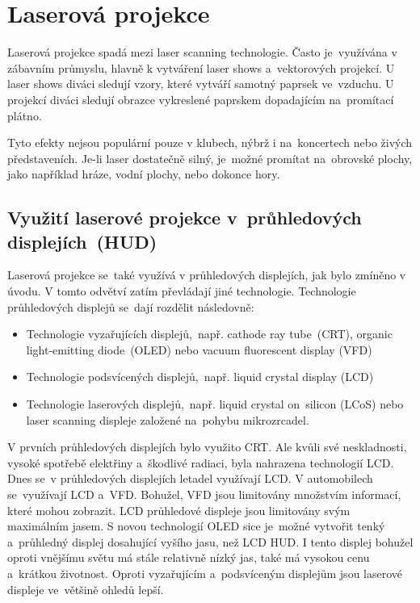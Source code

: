 \chapter{Laserová projekce~\cite{laser-projection}}
Laserová projekce spadá mezi laser scanning technologie. Často je~využívána v zábavním průmyslu, hlavně k vytváření laser shows a~vektorových projekcí. U laser shows diváci sledují vzory, které vytváří samotný paprsek ve~vzduchu. U projekcí diváci sledují obrazce vykreslené paprskem dopadajícím na~promítací plátno.

Tyto efekty nejsou populární pouze v klubech, nýbrž i na~koncertech nebo živých představeních. Je-li laser dostatečně silný, je~možné promítat na~obrovské plochy, jako například hráze, vodní plochy, nebo dokonce hory.

\section{Využití laserové projekce v~průhledových displejích~(HUD)~\cite{laser-huds}\cite{dev-of-laser-huds-in-driving}}
Laserová projekce se~také využívá v průhledových displejích, jak bylo zmíněno v úvodu. V tomto odvětví zatím převládají jiné technologie. Technologie průhledových displejů se~dají rozdělit následovně:

\begin{itemize}
  \item Technologie vyzařujících displejů,~např. cathode ray tube~(CRT), organic light-emitting diode~(OLED) nebo vacuum fluorescent display (VFD)
  \item Technologie podsvícených displejů,~např. liquid crystal display (LCD)
  \item Technologie laserových displejů,~např. liquid crystal on~silicon (LCoS) nebo laser scanning displeje založené na~pohybu mikrozrcadel.
\end{itemize}

V prvních průhledových displejích bylo využito CRT. Ale kvůli své neskladnosti, vysoké spotřebě elektřiny a~škodlivé radiaci, byla nahrazena technologií LCD. Dnes se~v průhledových displejích letadel využívají LCD. V automobilech se~využívají LCD a~VFD.
Bohužel, VFD jsou limitovány množstvím informací, které mohou zobrazit. LCD průhledové displeje jsou limitovány svým maximálním jasem.
S novou technologií OLED sice je~možné vytvořit tenký a~průhledný displej dosahující vyšího jasu, než LCD HUD.
I tento displej bohužel oproti vnějšímu světu má stále relativně nízký jas, také má vysokou cenu a~krátkou životnost.
Oproti vyzařujícím a~podsvíceným displejům jsou laserové displeje ve~většině ohledů lepší. 

